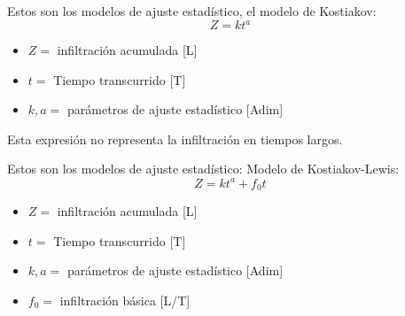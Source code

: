 Estos son los modelos de ajuste estadístico, el modelo de Kostiakov:
\begin{equation}
    Z = kt^a
\end{equation}
\begin{notation}
    \begin{itemize}
        \item $Z=$ infiltración acumulada [L]
        \item $t=$ Tiempo transcurrido [T]
        \item $k,a=$ parámetros de ajuste estadístico [Adim]
    \end{itemize}
\end{notation}
Esta expresión no representa la infiltración en tiempos largos.


Estos son los modelos de ajuste estadístico: Modelo de Kostiakov-Lewis:
\begin{equation}
    Z =kt^a + f_0t
\end{equation}
\begin{notation}
    \begin{itemize}
        \item $Z=$ infiltración acumulada [L]
        \item $t=$ Tiempo transcurrido [T]
        \item $k,a=$ parámetros de ajuste estadístico [Adim]
        \item $f_0=$ infiltración básica [L/T]
    \end{itemize}
\end{notation}

